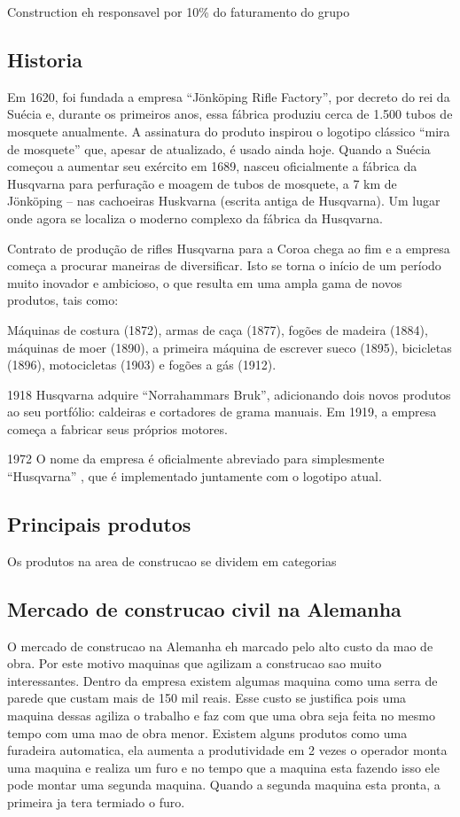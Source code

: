 \documentclass[12pt]{article}
\begin{document}
Construction eh responsavel por 10\% do faturamento do grupo
	
\subsection{Historia}
	Em 1620, foi fundada a empresa “Jönköping Rifle Factory”, por decreto do rei da Suécia e, durante os primeiros anos, essa fábrica produziu cerca de 1.500 tubos de mosquete anualmente. A assinatura do produto inspirou o logotipo clássico “mira de mosquete” que, apesar de atualizado, é usado ainda hoje.
Quando a Suécia começou a aumentar seu exército em 1689, nasceu oficialmente a fábrica da Husqvarna para perfuração e moagem de tubos de mosquete, a 7 km de Jönköping – nas cachoeiras Huskvarna (escrita antiga de Husqvarna). Um lugar onde agora se localiza o moderno complexo da fábrica da Husqvarna.

	Contrato de produção de rifles Husqvarna para a Coroa chega ao fim e a empresa começa a procurar maneiras de diversificar. Isto se torna o início de um período muito inovador e ambicioso, o que resulta em uma ampla gama de novos produtos, tais como:

	Máquinas de costura (1872), armas de caça (1877), fogões de madeira (1884), máquinas de moer (1890), a primeira máquina de escrever sueco (1895), bicicletas (1896), motocicletas (1903) e fogões a gás (1912).

	1918 Husqvarna adquire “Norrahammars Bruk”, adicionando dois novos produtos ao seu portfólio: caldeiras e cortadores de grama manuais. Em 1919, a empresa começa a fabricar seus próprios motores.

	1972 O nome da empresa é oficialmente abreviado para simplesmente “Husqvarna” , que é implementado juntamente com o logotipo atual.

\subsection{Principais produtos}
Os produtos na area de construcao se dividem em categorias

\subsection{Mercado de construcao civil na Alemanha}
	O mercado de construcao na Alemanha eh marcado pelo alto custo da mao de obra. Por este motivo maquinas que agilizam a construcao sao muito interessantes. Dentro da empresa existem algumas maquina como uma serra de parede que custam mais de 150 mil reais. Esse custo se justifica pois uma maquina dessas agiliza o trabalho e faz com que uma obra seja feita no mesmo tempo com uma mao de obra menor. Existem alguns produtos como uma furadeira automatica, ela aumenta a produtividade em 2 vezes o operador monta uma maquina e realiza um furo e no tempo que a maquina esta fazendo isso ele pode montar uma segunda maquina. Quando a segunda maquina esta pronta, a primeira ja tera termiado o furo.
\end{document}
